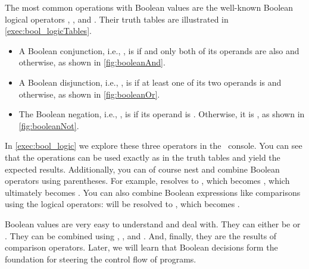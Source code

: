%
%
%
%
The most common operations with Boolean values are the well-known Boolean logical operators , , and .
Their truth tables are illustrated in \cref{exec:bool_logicTables}.%
%
\begin{itemize}%
%
\item A Boolean conjunction, i.e., , is  if and only both of its operands are also  and  otherwise, as shown in \cref{fig:booleanAnd}.%
%
\item A Boolean disjunction, i.e., , is  if at least one of its two operands is  and  otherwise, as shown in \cref{fig:booleanOr}.%
%
\item The Boolean negation, i.e., , is  if its operand is . %
Otherwise, it is , as shown in \cref{fig:booleanNot}.%
%
\end{itemize}%
%
\begin{sloppypar}%
In \cref{exec:bool_logic} we explore these three operators in the \python\ console.
You can see that the operations can be used exactly as in the truth tables and yield the expected results.
Additionally, you can of course nest and combine Boolean operators using parentheses\pythonIdx{(}\pythonIdx{)}.
For example,  resolves to , which becomes , which ultimately becomes .
You can also combine Boolean expressions like comparisons using the logical operators:
 will be resolved to , which becomes .%
\end{sloppypar}%
%
\endhsection%
%
%
%
Boolean values are very easy to understand and deal with.
They can either be  or .
They can be combined using , , and .
And, finally, they are the results of comparison operators.
Later, we will learn that Boolean decisions form the foundation for steering the control flow of programs.%
%
\endhsection%
\FloatBarrier%
\endhsection%
%
